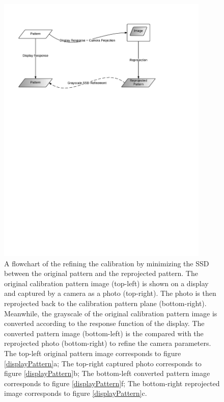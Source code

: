 \documentclass{report}
\begin{document}
\begin{figure}
\centering
\includegraphics[width=0.9\textwidth, trim=0.5in 7in 1.5in 0in, clip=true]{images/render-flow-chart.pdf}
\caption{A flowchart of the refining the calibration by minimizing the SSD between the original pattern and the reprojected pattern. The original calibration pattern image (top-left) is shown on a display and captured by a camera as a photo (top-right). The photo is then reprojected back to the calibration pattern plane (bottom-right).  Meanwhile, the grayscale of the original calibration pattern image is converted according to the response function of the display. The converted pattern image (bottom-left) is the compared with the reprojected photo (bottom-right) to refine the camera parameters. The top-left original pattern image corresponds to figure \ref{displayPattern}a; The top-right captured photo corresponds to figure \ref{displayPattern}b; The bottom-left converted pattern image corresponds to figure \ref{displayPattern}f; The bottom-right reprojected image corresponds to figure \ref{displayPattern}c.} 
\label{displayFlow}
\end{figure}
\end{document}
